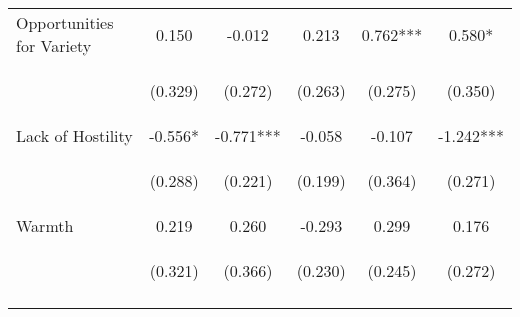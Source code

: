 \begin{tabular}{lccccc}
\noalign{\smallskip}Opportunities for Variety & 0.150 & -0.012 & 0.213 & 0.762*** & 0.580*\\
 & \begin{footnotesize}(0.329)\end{footnotesize} & \begin{footnotesize}(0.272)\end{footnotesize} & \begin{footnotesize}(0.263)\end{footnotesize} & \begin{footnotesize}(0.275)\end{footnotesize} & \begin{footnotesize}(0.350)\end{footnotesize}\\
\noalign{\smallskip}Lack of Hostility & -0.556* & -0.771*** & -0.058 & -0.107 & -1.242***\\
 & \begin{footnotesize}(0.288)\end{footnotesize} & \begin{footnotesize}(0.221)\end{footnotesize} & \begin{footnotesize}(0.199)\end{footnotesize} & \begin{footnotesize}(0.364)\end{footnotesize} & \begin{footnotesize}(0.271)\end{footnotesize}\\
\noalign{\smallskip}Warmth & 0.219 & 0.260 & -0.293 & 0.299 & 0.176\\
 & \begin{footnotesize}(0.321)\end{footnotesize} & \begin{footnotesize}(0.366)\end{footnotesize} & \begin{footnotesize}(0.230)\end{footnotesize} & \begin{footnotesize}(0.245)\end{footnotesize} & \begin{footnotesize}(0.272)\end{footnotesize}\\
\noalign{\smallskip}\hline\end{tabular}\\
